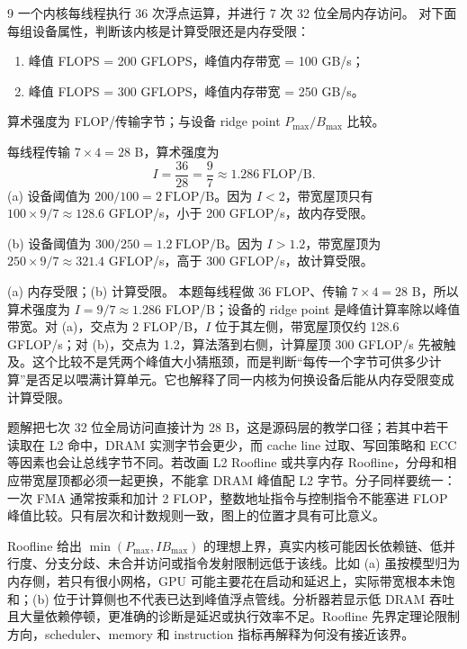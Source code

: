 \begin{solutionexercise}{9}
\problemheading 一个内核每线程执行 36 次浮点运算，并进行 7 次 32 位全局内存访问。
对下面每组设备属性，判断该内核是计算受限还是内存受限：
\begin{enumerate}[label=\alph*.,leftmargin=2.2em]
  \item 峰值 FLOPS = 200 GFLOPS，峰值内存带宽 = 100 GB/s；
  \item 峰值 FLOPS = 300 GFLOPS，峰值内存带宽 = 250 GB/s。
\end{enumerate}

\approachheading 算术强度为 FLOP/传输字节；与设备 ridge point
$P_{\max}/B_{\max}$ 比较。

\answerheading 每线程传输 $7\times4=28$ B，算术强度为
\[
I=\frac{36}{28}=\frac97\approx1.286\ \mathrm{FLOP/B}.
\]
(a) 设备阈值为 $200/100=2\ \mathrm{FLOP/B}$。因为 $I<2$，带宽屋顶只有
$100\times9/7\approx128.6$ GFLOP/s，小于 200 GFLOP/s，故内存受限。

(b) 设备阈值为 $300/250=1.2\ \mathrm{FLOP/B}$。因为 $I>1.2$，带宽屋顶为
$250\times9/7\approx321.4$ GFLOP/s，高于 300 GFLOP/s，故计算受限。

\conclusionheading (a) 内存受限；(b) 计算受限。
\discussionheading
{}
本题每线程做 36 FLOP、传输 $7\times4=28$ B，所以算术强度为 $I=9/7\approx1.286$ FLOP/B；设备的 ridge point 是峰值计算率除以峰值带宽。对 (a)，交点为 2 FLOP/B，$I$ 位于其左侧，带宽屋顶仅约 128.6 GFLOP/s；对 (b)，交点为 1.2，算法落到右侧，计算屋顶 300 GFLOP/s 先被触及。这个比较不是凭两个峰值大小猜瓶颈，而是判断“每传一个字节可供多少计算”是否足以喂满计算单元。它也解释了同一内核为何换设备后能从内存受限变成计算受限。

题解把七次 32 位全局访问直接计为 28 B，这是源码层的教学口径；若其中若干读取在 L2 命中，DRAM 实测字节会更少，而 cache line 过取、写回策略和 ECC 等因素也会让总线字节不同。若改画 L2 Roofline 或共享内存 Roofline，分母和相应带宽屋顶都必须一起更换，不能拿 DRAM 峰值配 L2 字节。分子同样要统一：一次 FMA 通常按乘和加计 2 FLOP，整数地址指令与控制指令不能塞进 FLOP 峰值比较。只有层次和计数规则一致，图上的位置才具有可比意义。

Roofline 给出 $\min(P_{\max},I B_{\max})$ 的理想上界，真实内核可能因长依赖链、低并行度、分支分歧、未合并访问或指令发射限制远低于该线。比如 (a) 虽按模型归为内存侧，若只有很小网格，GPU 可能主要花在启动和延迟上，实际带宽根本未饱和；(b) 位于计算侧也不代表已达到峰值浮点管线。分析器若显示低 DRAM 吞吐且大量依赖停顿，更准确的诊断是延迟或执行效率不足。Roofline 先界定理论限制方向，scheduler、memory 和 instruction 指标再解释为何没有接近该界。


\end{solutionexercise}
